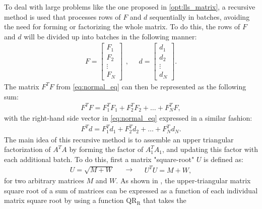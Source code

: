 \documentclass{article}
\begin{document}
To deal with large problems like the one proposed in \eqref{opt:lls_matrix}, a recursive
method is used that processes rows of $F$ and $d$ sequentially in batches, avoiding the need
for forming or factorizing the whole matrix. To do this, the rows of $F$ and $d$ will be
divided up into batches in the following manner:
\begin{equation}
    \begin{aligned}
        F = \begin{bmatrix} F_1 \\ F_2 \\ \vdots \\ F_N \end{bmatrix}
    \end{aligned},
    \quad 
    \begin{aligned}
        d = \begin{bmatrix} d_1 \\ d_2 \\ \vdots \\ d_N \end{bmatrix}.
    \end{aligned}
\end{equation}
The matrix $F^TF$ from \eqref{eq:normal_eq} can then be represented as the following sum:
\begin{align}
    F^TF = F_1^TF_1 + F_2^TF_2 + \ldots + F_N^TF,
\end{align}
with the right-hand side vector in \eqref{eq:normal_eq} expressed in a similar fashion:
\begin{align}
    F^Td = F_1^Td_1 + F_2^Td_2 + \ldots + F_N^Td_N.
\end{align}
The main idea of this recursive method is to assemble an upper triangular factorization of
$A^TA$ by forming the factor of $A_1^TA_1$, and updating this factor with each additional
batch. To do this, first a matrix "square-root" $U$ is defined as:
\begin{equation}\label{eq:sqrtm}
    \begin{aligned}
        U = \sqrt{M + W}
    \end{aligned}
    \quad 
    \rightarrow
    \quad 
    \begin{aligned}
        U^TU = M + W,
    \end{aligned}
\end{equation}
for two arbitrary matrices $M$ and $W$. As shown in , the
upper-triangular matrix square root of a sum of matrices can be expressed as a function of
each individual matrix square root by using a function $\operatorname{QR_R}$ that takes the
\end{document}
